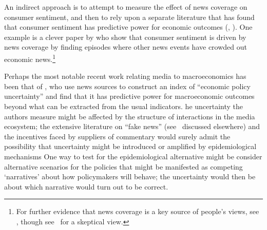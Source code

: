 An indirect approach is to attempt to measure the effect of news coverage on consumer sentiment, and then to rely upon a separate literature that has found that consumer sentiment has predictive power for economic outcomes (\cite{ludvigson2004consumer}, \cite{cfwSentiment}).  One example is a clever paper by \cite{doms2004consumer} who show that consumer sentiment is driven by news coverage by finding episodes where other news events have crowded out economic news.\footnote{For further evidence that news coverage is a key source of people's views, see \cite{lamla2012role}, though see~\cite{pfajfar2013news} for a skeptical view.}




Perhaps the most notable recent work relating media to macroeconomics has been that of \cite{baker2016measuring}, who use news sources to construct an index of ``economic policy uncertainty'' and find that it has predictive power for macroeconomic outcomes beyond what can be extracted from the usual indicators.  he uncertainty the authors measure might be affected by the structure of interactions in the media ecosystem; the extensive literature on ``fake news'' (see~\cite{allcott2017social} discussed elsewhere) and the incentives faced by suppliers of commentary would surely admit the possibility that uncertainty might be introduced or amplified by epidemiological mechanisms   One way to test for the epidemiological alternative might be consider alternative scenarios for the policies that might be manifested as competing `narratives' about how policymakers will behave; the uncertainty would then be about which narrative would turn out to be correct.

